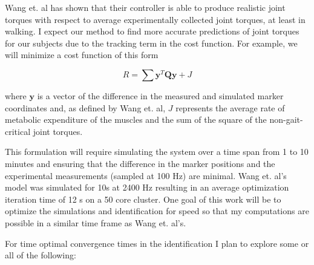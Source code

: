 \documentclass[11pt]{article}
\begin{document}
Wang et. al has shown that their controller is able to produce realistic joint
torques with respect to average experimentally collected joint torques, at
least in walking. I expect our method to find more accurate predictions of
joint torques for our subjects due to the tracking term in the cost function.
For example, we will minimize a cost function of this form

\begin{equation}
  R = \sum \mathbf{y}^T\mathbf{Q}\mathbf{y} + J
\end{equation}

where $\mathbf{y}$ is a vector of the difference in the measured and simulated
marker coordinates and, as defined by Wang et. al, $J$ represents the average
rate of metabolic expenditure of the muscles and the sum of the square of the
non-gait-critical joint torques.

This formulation will require simulating the system over a time span from 1 to
10 minutes and ensuring that the difference in the marker positions and the
experimental measurements (sampled at 100 Hz) are minimal. Wang et. al's model
was simulated for 10s at 2400 Hz resulting in an average optimization iteration
time of 12 s on a 50 core cluster. One goal of this work will be to optimize
the simulations and identification for speed so that my computations are
possible in a similar time frame as Wang et. al's.

For time optimal convergence times in the identification I plan to explore some
or all of the following:
\end{document}
